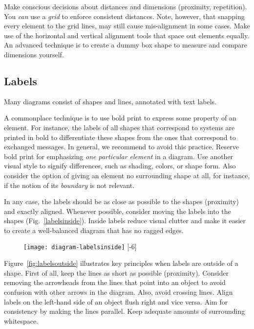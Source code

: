 Make conscious decisions about distances and dimensions (proximity, repetition). You \emph{can} use a \emph{grid} to enforce consistent distances. Note, however, that snapping every element to the grid lines, may still cause mis-alignment in some cases. Make use of the horizontal and vertical alignment tools that space out elements equally. An advanced technique is to create a dummy box shape to measure and compare dimensions yourself.

\subsection{Labels}

Many diagrams consist of shapes and lines, annotated with text labels.

A commonplace technique is to use bold print to express some property of an element. For instance, the labels of all shapes that correspond to systems are printed in bold to differentiate these shapes from the ones that correspond to exchanged  messages. In general, we recommend to avoid this practice. Reserve bold print for emphasizing \emph{one particular element} in a diagram. Use another visual style to signify differences, such as shading, colors, or shape form. Also consider the option of giving an element no surrounding shape at all, for instance, if the notion of its \emph{boundary} is not relevant.

In any case, the labels should be as close as possible to the shapes (proximity) and exactly aligned. Whenever possible, consider moving the labels into the shapes (Fig.~\ref{labelsinside}). Inside labels reduce visual clutter and make it easier to create a well-balanced diagram that has no ragged edges.

\begin{figure}[t]
\centering
\texttt{[image: diagram-labelsinside]}
[-6\baselineskip]
\end{figure}

Figure~\ref{fig:labelsoutside} illustrates key principles when labels are outside of a shape. First of all, keep the lines as short as possible (proximity). Consider removing the arrowheads from the lines that point into an object to avoid confusion with other arrows in the diagram. Also, avoid crossing lines. Align labels on the left-hand side of an object flush right and vice versa. Aim for consistency by making the lines parallel. Keep adequate amounts of surrounding whitespace.

